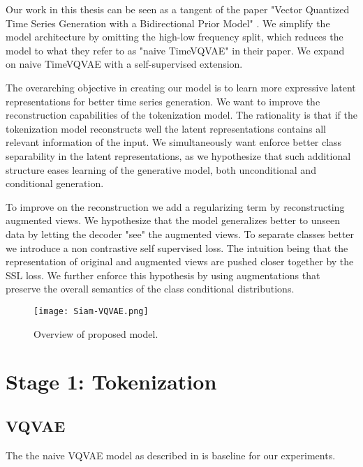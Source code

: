 \documentclass[../../thesis.tex]{subfiles}
\begin{document}
Our work in this thesis can be seen as a tangent of the paper "Vector Quantized Time Series Generation with a Bidirectional Prior Model" \cite{TimeVQVAE}. 
We simplify the model architecture by omitting the high-low frequency split, which reduces the model to what they refer to as "naive TimeVQVAE" in their paper. We expand on naive TimeVQVAE  with a self-supervised extension.\newline

The overarching objective in creating our model is to learn more expressive latent representations for better time series generation. We want to improve the reconstruction capabilities of the tokenization model. The rationality is that if the tokenization model reconstructs well the latent representations contains all relevant information of the input. We simultaneously want enforce better class separability in the latent representations, as we hypothesize that such additional structure eases learning of the generative model, both unconditional and conditional generation.\newline

To improve on the reconstruction we add a regularizing term by reconstructing augmented views. We hypothesize that the model generalizes better to unseen data by letting the decoder "see" the augmented views.\newline
To separate classes better we introduce a non contrastive self supervised loss. The intuition being that the representation of original and augmented views are pushed closer together by the SSL loss. We further enforce this hypothesis by using augmentations that preserve the overall semantics of the class conditional distributions. \newline






\begin{figure}[h]
    \texttt{[image: Siam-VQVAE.png]}
    \centering  
    \caption{Overview of proposed model.}
\end{figure}


\section{Stage 1: Tokenization}


\subsection{VQVAE}
The the naive VQVAE model as described in \cite{TimeVQVAE} is baseline for our experiments.\\
\end{document}
